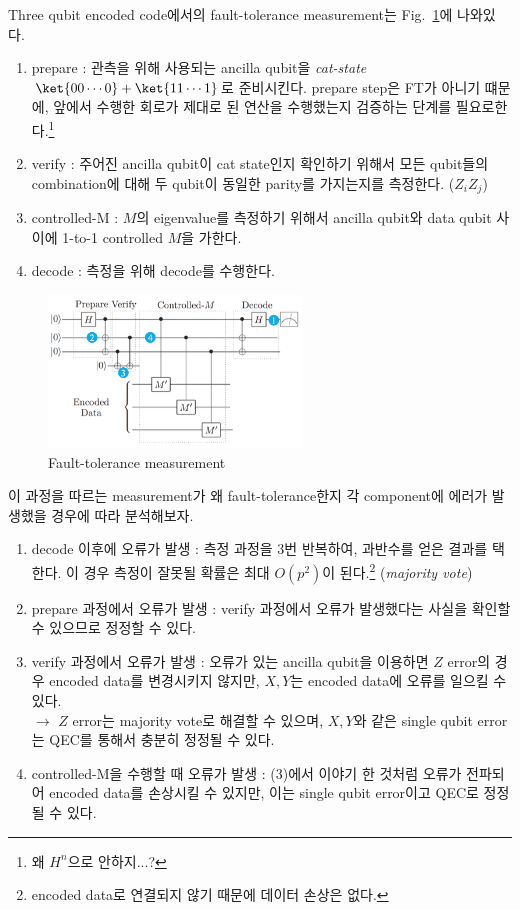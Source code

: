 Three qubit encoded code에서의 fault-tolerance measurement는 Fig.~\ref{fig:FT-measure}에 나와있다.
\begin{enumerate}
    \item prepare : 관측을 위해 사용되는 ancilla qubit을 \textit{cat-state} $\ket {00 \cdots 0} + \ket{11 \cdots 1}$로 준비시킨다. prepare step은 FT가 아니기 떄문에, 앞에서 수행한 회로가 제대로 된 연산을 수행했는지 검증하는 단계를 필요로한다.\footnote{왜 $H^n$으로 안하지...?}
    \item verify : 주어진 ancilla qubit이 cat state인지 확인하기 위해서 모든 qubit들의 combination에 대해 두 qubit이 동일한 parity를 가지는지를 측정한다. ($Z_iZ_j$)
    \item controlled-M : $M$의 eigenvalue를 측정하기 위해서 ancilla qubit와 data qubit 사이에 1-to-1 controlled $M$을 가한다.
    \item decode : 측정을 위해 decode를 수행한다.
\end{enumerate}

\begin{figure}[h]
    \centering
    \includegraphics[width=0.6\textwidth]{figures/C7_FT_measurement.png}
    \caption{Fault-tolerance measurement}
    \label{fig:FT-measure}
\end{figure}

이 과정을 따르는 measurement가 왜 fault-tolerance한지 각 component에 에러가 발생했을 경우에 따라 분석해보자.
\begin{enumerate}[(1)]
    \item decode 이후에 오류가 발생 : 측정 과정을 3번 반복하여, 과반수를 얻은 결과를 택한다. 이 경우 측정이 잘못될 확률은 최대 $O(p^2)$이 된다.\footnote{encoded data로 연결되지 않기 때문에 데이터 손상은 없다.} (\textit{majority vote})
    \item prepare 과정에서 오류가 발생 : verify 과정에서 오류가 발생했다는 사실을 확인할 수 있으므로 정정할 수 있다.
    \item verify 과정에서 오류가 발생 : 오류가 있는 ancilla qubit을 이용하면 $Z$ error의 경우 encoded data를 변경시키지 않지만, $X, Y$는 encoded data에 오류를 일으킬 수 있다.\\
    $\rightarrow$ $Z$ error는 majority vote로 해결할 수 있으며, $X, Y$와 같은 single qubit error는 QEC를 통해서 충분히 정정될 수 있다.
    \item controlled-M을 수행할 때 오류가 발생 : (3)에서 이야기 한 것처럼 오류가 전파되어 encoded data를 손상시킬 수 있지만, 이는 single qubit error이고 QEC로 정정될 수 있다. 
\end{enumerate}


